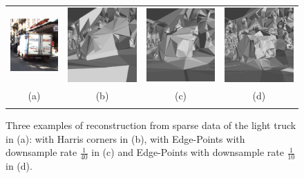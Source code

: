\begin{figure}[tp]
\centering
\setlength{\tabcolsep}{1px}
\begin{tabular}{cccc}
\includegraphics[width=0.24\columnwidth,height=0.25\columnwidth]{./img//imageOrig}&
\includegraphics[width=0.24\columnwidth,height=0.25\columnwidth]{./img//notedge}&
\includegraphics[width=0.24\columnwidth,height=0.25\columnwidth]{./img//edge40}&
\includegraphics[width=0.24\columnwidth,height=0.25\columnwidth]{./img//edge10}\\
(a) & (b)&(c) & (d)\\\\
\end{tabular}
\caption{Three examples of reconstruction from sparse data of the light truck in (a): with Harris corners in (b), with Edge-Points with downsample rate  $\frac{1}{40}$  in (c)  and Edge-Points with  downsample rate  $\frac{1}{10}$ in (d).}
\label{fig:reconstrEx}
\end{figure}





